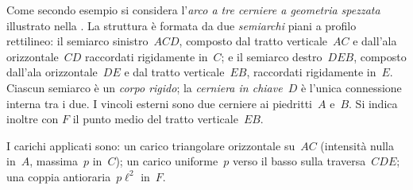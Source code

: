 Come secondo esempio si considera l'\emph{arco a tre cerniere
	a geometria spezzata} illustrato nella
.
La struttura è formata da due \emph{semiarchi} piani a profilo
rettilineo: il semiarco sinistro~$ACD$, composto dal tratto
verticale~$AC$ e dall'ala orizzontale~$CD$ raccordati
rigidamente in~$C$; e il semiarco destro~$DEB$, composto
dall'ala orizzontale~$DE$ e dal tratto verticale~$EB$,
raccordati rigidamente in~$E$.
Ciascun semiarco è un \emph{corpo rigido}; la
\emph{cerniera in chiave}~$D$ è l'unica connessione interna
tra i due. I vincoli esterni sono due cerniere ai
piedritti~$A$ e~$B$.
Si indica inoltre con $F$ il punto medio del tratto verticale~$EB$.

I carichi applicati sono: un carico triangolare orizzontale
su~$AC$ (intensità nulla in~$A$, massima~$p$ in~$C$);
un carico uniforme~$p$ verso il basso sulla traversa~$CDE$;
una coppia antioraria~$p\ell^2$ in~$F$.

